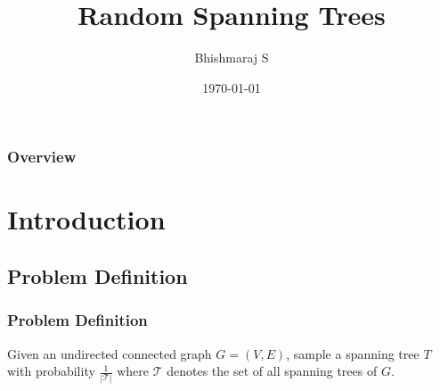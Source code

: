 \documentclass{beamer}
\title[Random Spanning Trees]{Random Spanning Trees} %
\author{Bhishmaraj S} %
\institute[CMI] %
{
Chennai Mathematical Institute \\ %
\medskip
\textit{bhishma@cmi.ac.in} %
}
\date{\today} %
\begin{document}
\begin{frame}
\titlepage %
\end{frame}

\begin{frame}
\frametitle{Overview} %

\tableofcontents %
\end{frame}


\section{Introduction} %

\subsection{Problem Definition} %

\begin{frame}
\frametitle{Problem Definition}

 Given an undirected connected graph $G = (V, E)$, sample a spanning tree $T$ with probability $\frac{1}{|\mathcal{T}|}$ where $\mathcal{T}$ denotes the set of all spanning trees of $G$. 
 
%  



\end{frame}
\end{document}
